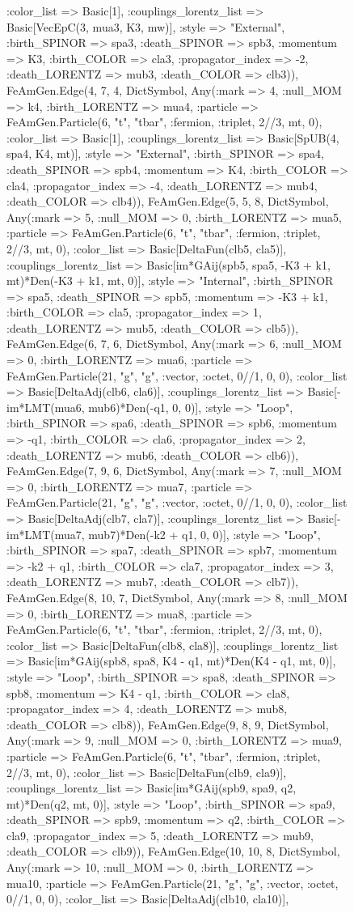 \documentclass{revtex4}
\begin{document}
\begin{figure}[!htb]
\begin{center}
{:color_list => Basic[1], :couplings_lorentz_list => Basic[VecEpC(3, mua3, K3, mw)], :style => "External", :birth_SPINOR => spa3, :death_SPINOR => spb3, :momentum => K3, :birth_COLOR => cla3, :propagator_index => -2, :death_LORENTZ => mub3, :death_COLOR => clb3)), FeAmGen.Edge(4, 7, 4, Dict{Symbol, Any}(:mark => 4, :null_MOM => k4, :birth_LORENTZ => mua4, :particle => FeAmGen.Particle(6, "t", "tbar", :fermion, :triplet, 2//3, mt, 0), :color_list => Basic[1], :couplings_lorentz_list => Basic[SpUB(4, spa4, K4, mt)], :style => "External", :birth_SPINOR => spa4, :death_SPINOR => spb4, :momentum => K4, :birth_COLOR => cla4, :propagator_index => -4, :death_LORENTZ => mub4, :death_COLOR => clb4)), FeAmGen.Edge(5, 5, 8, Dict{Symbol, Any}(:mark => 5, :null_MOM => 0, :birth_LORENTZ => mua5, :particle => FeAmGen.Particle(6, "t", "tbar", :fermion, :triplet, 2//3, mt, 0), :color_list => Basic[DeltaFun(clb5, cla5)], :couplings_lorentz_list => Basic[im*GAij(spb5, spa5, -K3 + k1, mt)*Den(-K3 + k1, mt, 0)], :style => "Internal", :birth_SPINOR => spa5, :death_SPINOR => spb5, :momentum => -K3 + k1, :birth_COLOR => cla5, :propagator_index => 1, :death_LORENTZ => mub5, :death_COLOR => clb5)), FeAmGen.Edge(6, 7, 6, Dict{Symbol, Any}(:mark => 6, :null_MOM => 0, :birth_LORENTZ => mua6, :particle => FeAmGen.Particle(21, "g", "g", :vector, :octet, 0//1, 0, 0), :color_list => Basic[DeltaAdj(clb6, cla6)], :couplings_lorentz_list => Basic[-im*LMT(mua6, mub6)*Den(-q1, 0, 0)], :style => "Loop", :birth_SPINOR => spa6, :death_SPINOR => spb6, :momentum => -q1, :birth_COLOR => cla6, :propagator_index => 2, :death_LORENTZ => mub6, :death_COLOR => clb6)), FeAmGen.Edge(7, 9, 6, Dict{Symbol, Any}(:mark => 7, :null_MOM => 0, :birth_LORENTZ => mua7, :particle => FeAmGen.Particle(21, "g", "g", :vector, :octet, 0//1, 0, 0), :color_list => Basic[DeltaAdj(clb7, cla7)], :couplings_lorentz_list => Basic[-im*LMT(mua7, mub7)*Den(-k2 + q1, 0, 0)], :style => "Loop", :birth_SPINOR => spa7, :death_SPINOR => spb7, :momentum => -k2 + q1, :birth_COLOR => cla7, :propagator_index => 3, :death_LORENTZ => mub7, :death_COLOR => clb7)), FeAmGen.Edge(8, 10, 7, Dict{Symbol, Any}(:mark => 8, :null_MOM => 0, :birth_LORENTZ => mua8, :particle => FeAmGen.Particle(6, "t", "tbar", :fermion, :triplet, 2//3, mt, 0), :color_list => Basic[DeltaFun(clb8, cla8)], :couplings_lorentz_list => Basic[im*GAij(spb8, spa8, K4 - q1, mt)*Den(K4 - q1, mt, 0)], :style => "Loop", :birth_SPINOR => spa8, :death_SPINOR => spb8, :momentum => K4 - q1, :birth_COLOR => cla8, :propagator_index => 4, :death_LORENTZ => mub8, :death_COLOR => clb8)), FeAmGen.Edge(9, 8, 9, Dict{Symbol, Any}(:mark => 9, :null_MOM => 0, :birth_LORENTZ => mua9, :particle => FeAmGen.Particle(6, "t", "tbar", :fermion, :triplet, 2//3, mt, 0), :color_list => Basic[DeltaFun(clb9, cla9)], :couplings_lorentz_list => Basic[im*GAij(spb9, spa9, q2, mt)*Den(q2, mt, 0)], :style => "Loop", :birth_SPINOR => spa9, :death_SPINOR => spb9, :momentum => q2, :birth_COLOR => cla9, :propagator_index => 5, :death_LORENTZ => mub9, :death_COLOR => clb9)), FeAmGen.Edge(10, 10, 8, Dict{Symbol, Any}(:mark => 10, :null_MOM => 0, :birth_LORENTZ => mua10, :particle => FeAmGen.Particle(21, "g", "g", :vector, :octet, 0//1, 0, 0), :color_list => Basic[DeltaAdj(clb10, cla10)], }
\end{center}
\end{figure}
\end{document}
